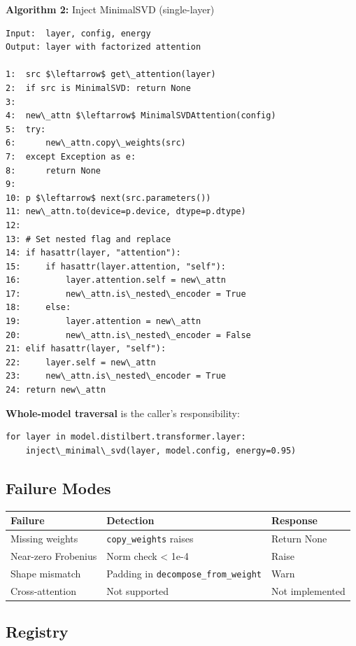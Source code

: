 \textbf{Algorithm 2:} Inject MinimalSVD (single-layer)
\begin{lstlisting}
Input:  layer, config, energy  
Output: layer with factorized attention

1:  src $\leftarrow$ get\_attention(layer)
2:  if src is MinimalSVD: return None
3:
4:  new\_attn $\leftarrow$ MinimalSVDAttention(config)
5:  try:
6:      new\_attn.copy\_weights(src)
7:  except Exception as e:
8:      return None
9:
10: p $\leftarrow$ next(src.parameters())
11: new\_attn.to(device=p.device, dtype=p.dtype)
12:
13: # Set nested flag and replace
14: if hasattr(layer, "attention"):
15:     if hasattr(layer.attention, "self"):
16:         layer.attention.self = new\_attn
17:         new\_attn.is\_nested\_encoder = True
18:     else:
19:         layer.attention = new\_attn
20:         new\_attn.is\_nested\_encoder = False
21: elif hasattr(layer, "self"):
22:     layer.self = new\_attn
23:     new\_attn.is\_nested\_encoder = True
24: return new\_attn
\end{lstlisting}

\textbf{Whole-model traversal} is the caller's responsibility:

\begin{lstlisting}
for layer in model.distilbert.transformer.layer:
    inject\_minimal\_svd(layer, model.config, energy=0.95)
\end{lstlisting}

\subsection{Failure Modes}

\begin{table}[H]
\centering
\small
\begin{tabular}{lll}
\toprule
\textbf{Failure} & \textbf{Detection} & \textbf{Response} \\
\midrule
Missing weights & \texttt{copy\_weights} raises & Return None \\
Near-zero Frobenius & Norm check \textless{} 1e-4 & Raise \\
Shape mismatch & Padding in \texttt{decompose\_from\_weight} & Warn \\
Cross-attention & Not supported & Not implemented \\
\bottomrule
\end{tabular}
\end{table}

\subsection{Registry}

